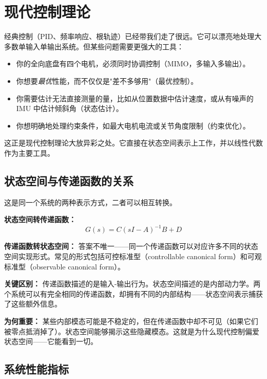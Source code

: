 \section{现代控制理论}

经典控制（PID、频率响应、根轨迹）已经带我们走了很远。它可以漂亮地处理大多数单输入单输出系统。但某些问题需要更强大的工具：

\begin{itemize}
    \item 你的全向底盘有四个电机，必须同时协调控制（MIMO，多输入多输出）。
    \item 你想要\textit{最优}性能，而不仅仅是"差不多够用"（最优控制）。
    \item 你需要估计无法直接测量的量，比如从位置数据中估计速度，或从有噪声的 IMU 中估计倾斜角（状态估计）。
    \item 你想明确地处理约束条件，如最大电机电流或关节角度限制（约束优化）。
\end{itemize}

这正是现代控制理论大放异彩之处。它直接在状态空间表示上工作，并以线性代数作为主要工具。

\subsection{状态空间与传递函数的关系}

这是同一个系统的两种表示方式，二者可以相互转换。

\textbf{状态空间转传递函数：}
\begin{equation}
G(s) = C(sI - A)^{-1}B + D
\end{equation}

\textbf{传递函数转状态空间：} 答案不唯一——同一个传递函数可以对应许多不同的状态空间实现形式。常见的形式包括可控标准型（controllable canonical form）和可观标准型（observable canonical form）。

\textbf{关键区别：} 传递函数描述的是输入-输出行为。状态空间描述的是内部动力学。两个系统可以有完全相同的传递函数，却拥有不同的内部结构——状态空间表示捕获了这些额外信息。

\textbf{为何重要：} 某些内部模态可能是不稳定的，但在传递函数中却不可见（如果它们被零点抵消掉了）。状态空间能够揭示这些隐藏模态。这就是为什么现代控制偏爱状态空间——它能看到一切。

\subsection{系统性能指标}

